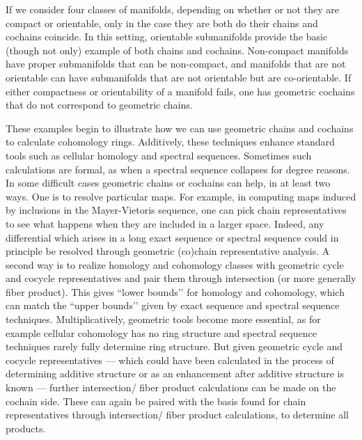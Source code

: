 If we consider four classes of manifolds, depending on whether or not they are compact or orientable, only in the case they are both do their chains and cochains coincide.
In this setting, orientable submanifolds provide the basic (though not only) example of both chains and cochains.
Non-compact manifolds have proper submanifolds that can be non-compact, and manifolds that are not orientable can have submanifolds that are not orientable but are co-orientable.
If either compactness or orientability of a manifold fails, one has geometric cochains that do not correspond to geometric chains.






\medskip
These examples begin to illustrate how we can use geometric chains and cochains to calculate cohomology rings.
Additively, these techniques enhance standard tools such as cellular homology and spectral sequences.
Sometimes such calculations are formal, as when a spectral sequence collapses for degree reasons.
In some difficult cases geometric chains or cochains can help, in at least two ways.
One is to resolve particular maps.
For example, in computing maps induced by inclusions in the Mayer-Vietoris sequence, one can pick chain representatives to see what happens when they are included in a larger space.
Indeed, any differential which arises in a long exact sequence or spectral sequence could in principle be resolved through geometric (co)chain representative analysis.
A second way is to realize homology and cohomology classes with geometric cycle and cocycle representatives and pair them through intersection (or more generally fiber product).
This gives ``lower bounds’’ for homology and cohomology, which can match the ``upper bounds’’ given by exact sequence and spectral sequence techniques.
Multiplicatively, geometric tools become more essential, as for example cellular cohomology has no ring structure and spectral sequence techniques rarely fully determine ring structure.
But given geometric cycle and cocycle representatives --- which could have been calculated in the process of determining additive structure or as an enhancement after additive structure is known --- further intersection/ fiber product calculations can be made on the cochain side.
These can again be paired with the basis found for chain representatives through intersection/ fiber product calculations, to determine all products.

